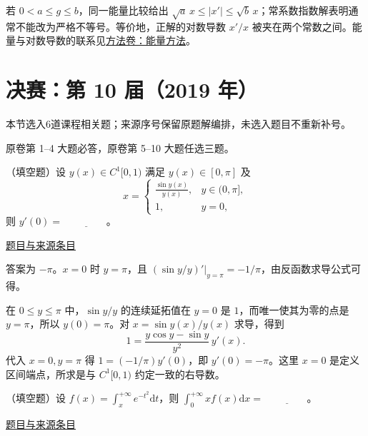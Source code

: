 \documentclass[UTF8,12pt,a4paper,fontset=fandol]{ctexart}
\begin{document}
\begin{remark}[方法与条件]若 $0<a\leq g\leq b$，同一能量比较给出 $\sqrt a\,x\leq|x'|\leq\sqrt b\,x$；常系数指数解表明通常不能改为严格不等号。等价地，正解的对数导数 $x'/x$ 被夹在两个常数之间。能量与对数导数的联系见\hyperref[app:dynamics-energy]{方法卷：能量方法}。\end{remark}

\section{决赛：第 10 届（2019 年）}

本节选入6道课程相关题；来源序号保留原题解编排，未选入题目不重新补号。

\begin{remark}[来源说明]原卷第 1--4 大题必答，原卷第 5--10 大题任选三题。\end{remark}

\begin{example}[来源序号2]\label{ex:fin10-hi:2}\label{pr:fin10-hi:2}

（填空题）设 $y(x) \in C^{1}[0,1)$ 满足 $y(x) \in [0,\pi]$ 及
\[
x = \begin{cases} \frac{\sin y(x)}{y(x)}, & y \in (0,\pi], \\ 1, & y=0, \end{cases}
\]
则 $y'(0) = $ $\underline{\qquad\qquad}$。

\par\href{https://github.com/lzxcr/cmc-mathematics/blob/64916fa1fdbc3e444a652eca204d5669058ee321/src/problems/finals/10/02.md}{题目与来源条目}

\end{example}

\begin{solve}\label{ans:fin10-hi:2}

答案为 $-\pi$。$x=0$ 时 $y=\pi$，且 $\left.(\sin y/y)'\right|_{y=\pi}=-1/\pi$，由反函数求导公式可得。

在 $0\le y\le\pi$ 中，$\sin y/y$ 的连续延拓值在 $y=0$ 是 $1$，而唯一使其为零的点是 $y=\pi$，所以 $y(0)=\pi$。对 $x=\sin y(x)/y(x)$ 求导，得到
\[
1=\frac{y\cos y-\sin y}{y^2}\,y'(x).
\]
代入 $x=0,y=\pi$ 得 $1=(-1/\pi)y'(0)$，即 $y'(0)=-\pi$。这里 $x=0$ 是定义区间端点，所求是与 $C^1[0,1)$ 约定一致的右导数。

\end{solve}

\begin{example}[来源序号3]\label{ex:fin10-hi:3}\label{pr:fin10-hi:3}

（填空题）设 $f(x) = \int_{x}^{+\infty} e^{-t^{2}} \mathrm{d} t$，则 $\int_{0}^{+\infty} xf(x) \mathrm{d} x = $ $\underline{\qquad\qquad}$。

\par\href{https://github.com/lzxcr/cmc-mathematics/blob/64916fa1fdbc3e444a652eca204d5669058ee321/src/problems/finals/10/03.md}{题目与来源条目}

\end{example}
\end{document}
